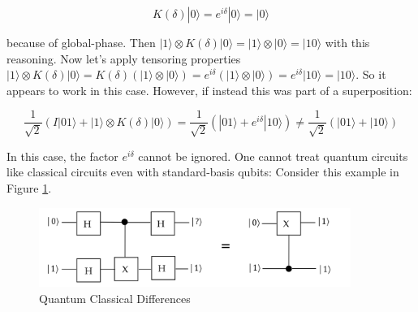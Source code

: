 \documentclass[main.tex]{subfiles}
\begin{document}
    $$
    K(\delta)|0\rangle=e^{i \delta}|0\rangle=|0\rangle
    $$
    
    because of global-phase. Then $|1\rangle \otimes K(\delta)|0\rangle=|1\rangle \otimes|0\rangle=|10\rangle$ with this reasoning. Now let's apply tensoring properties
    $|1\rangle \otimes K(\delta)|0\rangle=K(\delta)(|1\rangle \otimes|0\rangle)=e^{i \delta}(|1\rangle \otimes|0\rangle)=e^{i \delta}|10\rangle=|10\rangle$. So it appears to work in this case. However, if instead this was part of a superposition:
    
    $$
    \frac{1}{\sqrt{2}}(I|01\rangle+|1\rangle \otimes K(\delta)|0\rangle)=\frac{1}{\sqrt{2}}\left(|01\rangle+e^{i \delta}|10\rangle\right) \neq \frac{1}{\sqrt{2}}(|01\rangle+|10\rangle)
    $$
    
    In this case, the factor $e^{i \delta}$ cannot be ignored. One cannot treat quantum circuits like classical circuits even with standard-basis qubits: Consider this example in Figure \ref{fig:49caveat3}.
    
    \begin{figure}
        \centering
        \includegraphics[width=4in]{notes/figs/n08/49caveat3.png}
        \caption{Quantum Classical Differences}
        \label{fig:49caveat3}
    \end{figure}
\end{document}
